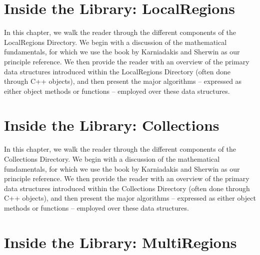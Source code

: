 
%

%



\chapter{Inside the Library: LocalRegions}
\label{chap:localregions}


In this chapter, we walk the reader through the different components
of the LocalRegions Directory.  We begin with a discussion of the
mathematical fundamentals, for which we use the book by Karniadakis
and Sherwin \cite{KaSh05} as our principle reference.  We then provide
the reader with an overview of the primary data structures introduced
within the LocalRegions Directory (often done through C++ objects),
and then present the major algorithms -- expressed as either object
methods or functions -- employed over these data structures.


%

%



\chapter{Inside the Library: Collections}

In this chapter, we walk the reader through the different components
of the Collections Directory.  We begin with a discussion of the
mathematical fundamentals, for which we use the book by Karniadakis
and Sherwin \cite{KaSh05} as our principle reference.  We then provide
the reader with an overview of the primary data structures introduced
within the Collections Directory (often done through C++ objects), and
then present the major algorithms -- expressed as either object
methods or functions -- employed over these data structures.


%

%



\chapter{Inside the Library: MultiRegions}
\label{chap:multiregions}


